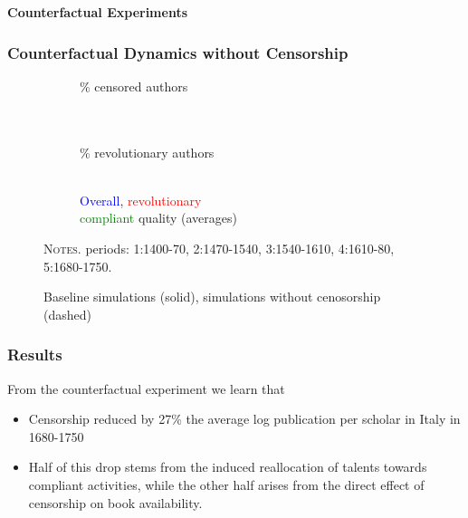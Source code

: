\documentclass[aspectratio=169,red,12pt]{beamer}
\begin{document}
\begin{frame}{}
	\centering \Huge
	{\color{structure}\textbf{Counterfactual Experiments}}
\end{frame}

\begin{frame}
	\frametitle{Counterfactual Dynamics without Censorship}
  \begin{figure}[htbp]	
  	\centering
  	\hspace*{-1cm}
  	\begin{subfigure}{.32\textwidth}
  		\centering
  		\caption{\% censored authors\\\textcolor{white}{a}\\\textcolor{white}{a}}
  		\label{sf:ca}
  		\scalebox{0.35}{ }
  	\end{subfigure}
  	\begin{subfigure}{.32\textwidth}
  		\centering
  		\caption{\% revolutionary authors\\\textcolor{white}{a}}
  		\label{sf:ra}
  		\scalebox{0.35}{ }
  	\end{subfigure}
  	\begin{subfigure}{.32\textwidth}
  		\centering
  		\caption{\textcolor{blue}{Overall}, \textcolor{red}{revolutionary}\\ \textcolor{green}{compliant} quality (averages)}
  		\label{sf:dq}
  		\scalebox{0.35}{ }
  	\end{subfigure}
  	\caption{Baseline simulations (solid), simulations without cenosorship (dashed)}
  	\label{fig:exp}\vspace{0.5em}
  	\begin{minipage}{0.99\textwidth} %
  		{\footnotesize \textsc{Notes.} periods: 1:1400-70, 2:1470-1540, 3:1540-1610, 4:1610-80, 5:1680-1750. \par}
  	\end{minipage}
  \end{figure}
  
\end{frame}


\begin{frame}
	\frametitle{Results}
	From the counterfactual experiment we learn that\vspace{0.1cm}
	
	\begin{itemize}
	\item Censorship reduced by 27\% the average log publication per scholar in Italy in 1680-1750\vspace{0.2cm}
	\item  Half of this drop stems from the induced reallocation of talents towards compliant activities, while the other half arises from the direct effect of censorship on book availability.\vspace{0.5cm}
	\end{itemize}


\end{frame}
\end{document}
